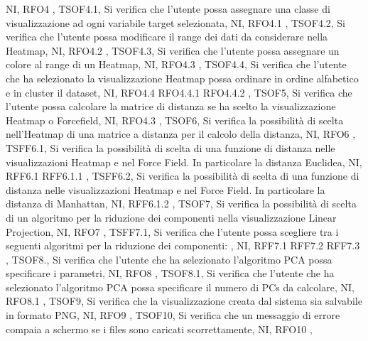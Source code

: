 {{        NI,
        RFO4
    },
    {   
        TSOF4.1,
        Si verifica che l'utente possa assegnare una classe di visualizzazione ad ogni variabile target selezionata,
        NI,
        RFO4.1
    },
    {   
        TSOF4.2,
        Si verifica che l'utente possa modificare il range dei dati da considerare nella Heatmap,
        NI,
        RFO4.2
    },
    {   
        TSOF4.3,
        Si verifica che l'utente possa assegnare un colore al range di un Heatmap,
        NI,
        RFO4.3
    },
    {   
        TSOF4.4,
        Si verifica che l'utente che ha selezionato la visualizzazione Heatmap possa ordinare in ordine alfabetico e in cluster il dataset,
        NI,
        RFO4.4 RFO4.4.1 RFO4.4.2
    },
    {   
        TSOF5,
        Si verifica che l'utente possa calcolare la matrice di distanza se ha scelto la visualizzazione Heatmap o Forcefield,
        NI,
        RFO4.3
    },    
    {   
        TSOF6,
        Si verifica la possibilità di scelta nell'Heatmap di una matrice a distanza per il calcolo della distanza,
        NI,
        RFO6
    },
    {   
        TSFF6.1,
        Si verifica la possibilità di scelta di una funzione di distanza nelle visualizzazioni Heatmap e nel Force Field. In particolare la distanza Euclidea,
        NI,
        RFF6.1 RFF6.1.1
    },
    {   
        TSFF6.2,
        Si verifica la possibilità di scelta di una funzione di distanza nelle visualizzazioni Heatmap e nel Force Field. In particolare la distanza di Manhattan,
        NI,
        RFF6.1.2
    },
    {   
        TSOF7,
        Si verifica la possibilità di scelta di un algoritmo per la riduzione dei componenti nella visualizzazione Linear Projection,
        NI,
        RFO7
    },
    {   
        TSFF7.1,
        Si verifica che l'utente possa scegliere tra i seguenti algoritmi per la riduzione dei componenti:
        ,
        NI,
        RFF7.1 RFF7.2 RFF7.3
    },
    {   
        TSOF8.,
        Si verifica che l'utente che ha selezionato l'algoritmo PCA possa specificare i parametri,
        NI,
        RFO8
    },
    {   
        TSOF8.1,
        Si verifica che l'utente che ha selezionato l'algoritmo PCA possa specificare il numero di PCs da calcolare,
        NI,
        RFO8.1
    },
    {   
        TSOF9,
        Si verifica che la visualizzazione creata dal sistema sia salvabile in formato PNG,
        NI,
        RFO9
    },
    {   
        TSOF10,
        Si verifica che un messaggio di errore compaia a schermo se i files sono caricati scorrettamente,
        NI,
        RFO10
    },
    }
    
    
